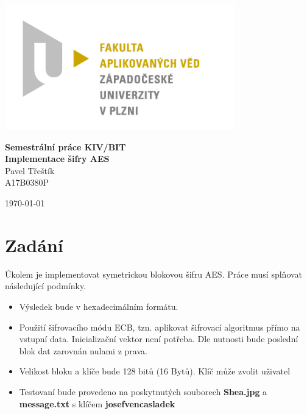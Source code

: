 \documentclass[12pt]{article}
\begin{document}
\begin{titlepage}
\centerline{\includegraphics[width=10cm]{img/logo.jpg}}
\begin{center}
\vspace{30px}
{\Huge
\textbf{Semestrální práce KIV/BIT}\\
\vspace{1cm}
}
{\Large
\textbf{Implementace šifry AES}\\
}
\vspace{1cm}
{\large
Pavel Třeštík\\
}
{\normalsize
A17B0380P
}
\end{center}
\vspace{\fill}
\hfill
\begin{minipage}[t]{7cm}
\flushright
\today
\end{minipage}
\end{titlepage}

\tableofcontents
\newpage
{} %
%
%
\section{Zadání}
Úkolem je implementovat symetrickou blokovou šifru AES. Práce musí splňovat
následující podmínky.
\begin{itemize}
	\item Výsledek bude v hexadecimálním formátu.
	\item Použití šifrovacího módu ECB, tzn. aplikovat šifrovací algoritmus
		přímo na vstupní data. Inicializační vektor není potřeba.
		Dle nutnosti bude poslední blok dat zarovnán nulami z prava.
	\item Velikost bloku a klíče bude 128 bitů (16 Bytů). Klíč může zvolit
		uživatel
	\sloppy	\item Testovaní bude provedeno na poskytnutých souborech \textbf{Shea.jpg}
		a\,\textbf{message.txt} s klíčem \textbf{josefvencasladek}
\end{itemize}
%
%
\pagebreak
%
\end{document}
